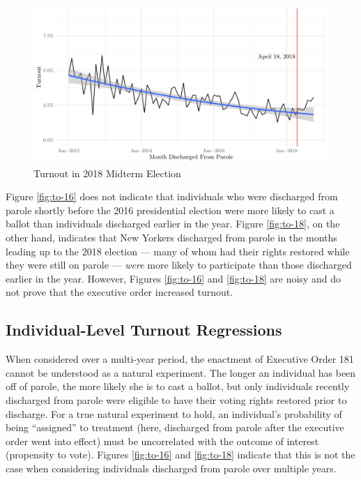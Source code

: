 \documentclass[12pt,]{article}
\begin{document}
\begin{figure}[H]

{\centering \includegraphics{felony_disenfranchisement_nys_files/figure-latex/to-18-chart-1} 

}

\caption{\label{fig:to-18}Turnout in 2018 Midterm Election}\label{fig:to-18-chart}
\end{figure}

Figure \ref{fig:to-16} does not indicate that individuals who were discharged from parole shortly before the 2016 presidential election were more likely to cast a ballot than individuals discharged earlier in the year. Figure \ref{fig:to-18}, on the other hand, indicates that New Yorkers discharged from parole in the months leading up to the 2018 election --- many of whom had their rights restored while they were still on parole --- \emph{were} more likely to participate than those discharged earlier in the year. However, Figures \ref{fig:to-16} and \ref{fig:to-18} are noisy and do not prove that the executive order increased turnout.

\hypertarget{individual-level-turnout-regressions}{%
\subsection*{Individual-Level Turnout Regressions}\label{individual-level-turnout-regressions}}

When considered over a multi-year period, the enactment of Executive Order 181 cannot be understood as a natural experiment. The longer an individual has been off of parole, the more likely she is to cast a ballot, but only individuals recently discharged from parole were eligible to have their voting rights restored prior to discharge. For a true natural experiment to hold, an individual's probability of being ``assigned'' to treatment (here, discharged from parole after the executive order went into effect) must be uncorrelated with the outcome of interest (propensity to vote). Figures \ref{fig:to-16} and \ref{fig:to-18} indicate that this is not the case when considering individuals discharged from parole over multiple years.
\end{document}
